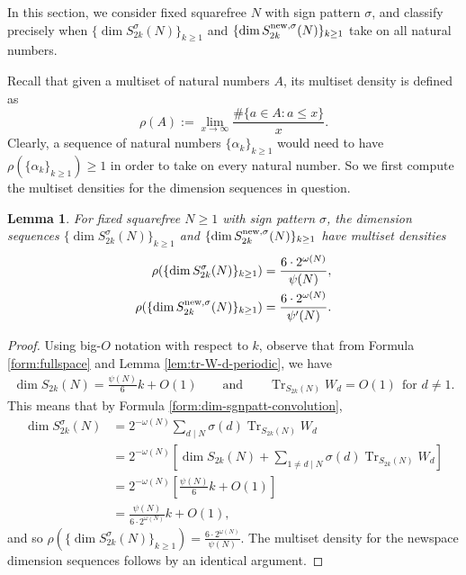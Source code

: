 \documentclass[12pt,letterpaper,reqno]{amsart}
\newtheorem{lemma}[theorem]{Lemma}
\theoremstyle{definition}
\numberwithin{equation}{section}
\numberwithin{figure}{section}
\numberwithin{table}{section}
\newcommand{\lrb}[1]{\left[#1\right]}
\DeclareMathOperator{\Tr}{Tr}
\newcommand{\nw}{{\textnormal{new}}}
\begin{document}
In this section, we consider fixed squarefree $N$ with sign pattern $\sigma$, and classify precisely when $\{ \dim S_{2k}^\sigma(N) \}_{k\ge1}$ and $\{ \dim S_{2k}^{\nw,\sigma}(N) \}_{k\ge1}$ take on all natural numbers. 

Recall that given a multiset of natural numbers $A$, its multiset density is defined as
$$
\rho(A) := \lim_{x \to \infty} \frac{ \#\{a \in A \colon a \le x\} }{ x }.
$$
Clearly, a sequence of natural numbers $\{\alpha_k\}_{k\ge1}$ would need to have $\rho(\{\alpha_k\}_{k\ge1}) \ge 1$ in order to take on every natural number. 
So we first compute the multiset densities for the dimension sequences in question.
\begin{lemma} \label{lem:multiset-density}
    For fixed squarefree $N \ge 1$ with sign pattern $\sigma$, the dimension sequences $\{ \dim S_{2k}^\sigma(N) \}_{k\ge1}$ and $\{ \dim S_{2k}^{\nw,\sigma}(N) \}_{k\ge1}$ have multiset densities
    \begin{align}
        \rho(\{ \dim S_{2k}^\sigma(N) \}_{k\ge1}) 
        &= \frac{6 \cdot 2^{\omega(N)}}{\psi(N)}, \\
        \rho(\{ \dim S_{2k}^{\nw,\sigma}(N) \}_{k\ge1} )
        &= \frac{6 \cdot 2^{\omega(N)}}{\psi'(N)}.
    \end{align}
\end{lemma}
\begin{proof}
    Using big-$O$ notation with respect to $k$, observe that from Formula \ref{form:fullspace} and Lemma \ref{lem:tr-W-d-periodic}, we have
    \begin{align}
        \dim S_{2k}(N) = \frac{\psi(N)}{6} k + O(1) \qquad \text{and} \qquad \Tr_{S_{2k}(N)} W_d = O(1) \ \ \text{for } d \ne 1.
    \end{align}
    This means that by Formula \ref{form:dim-sgnpatt-convolution},
    \begin{align}
        \dim S_{2k}^\sigma(N) &= 2^{- \omega(N)}\sum_{d \mid N} \sigma(d) \Tr_{S_{2k}(N)} W_d \\
        &= 2^{- \omega(N)} \lrb{ \dim S_{2k}(N)  +   \sum_{1 \ne d \mid N} \sigma(d) \Tr_{S_{2k}(N)} W_d } \\ 
        &= 2^{-\omega(N)} \lrb{ \frac{\psi(N)}{6} k + O(1) } \\
        &= \frac{\psi(N)}{6 \cdot 2^{\omega(N)}} k + O(1), \label{eqn:fullspace-sgnpatt-dim-special-form}
    \end{align}
    and so $\rho(\{ \dim S_{2k}^\sigma(N) \}_{k\ge1}) 
        = \frac{6 \cdot 2^{\omega(N)}}{\psi(N)}$.
    The multiset density for the newspace dimension sequences follows by an identical argument.  
\end{proof}
\end{document}
